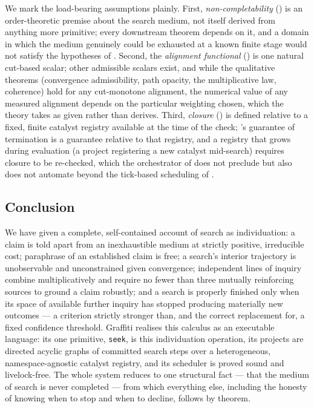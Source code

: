 \documentclass[11pt,twocolumn,a4paper]{article}
\theoremstyle{thmstyle}
\theoremstyle{definition}
\theoremstyle{remark}
\begin{document}
We mark the load-bearing assumptions plainly. First, \emph{non-completability}
() is an order-theoretic premise about the search
medium, not itself derived from anything more primitive; every downstream
theorem depends on it, and a domain in which the medium genuinely could be
exhausted at a known finite stage would not satisfy the hypotheses of
. Second, the \emph{alignment functional}
() is one natural cut-based scalar; other admissible
scalars exist, and while the qualitative theorems (convergence
admissibility, path opacity, the multiplicative law, coherence) hold for
any cut-monotone alignment, the numerical value of any measured alignment
depends on the particular weighting chosen, which the theory takes as
given rather than derives. Third, \emph{closure}
() is defined relative to a fixed, finite catalyst
registry available at the time of the check; 's
guarantee of termination is a guarantee relative to that registry, and a
registry that grows during evaluation (a project registering a new
catalyst mid-search) requires closure to be re-checked, which the
orchestrator of  does not preclude but also does
not automate beyond the tick-based scheduling of .

\subsection{Conclusion}

We have given a complete, self-contained account of search as
individuation: a claim is told apart from an inexhaustible medium at
strictly positive, irreducible cost; paraphrase of an established claim is
free; a search's interior trajectory is unobservable and unconstrained
given convergence; independent lines of inquiry combine multiplicatively
and require no fewer than three mutually reinforcing sources to ground a
claim robustly; and a search is properly finished only when its space of
available further inquiry has stopped producing materially new outcomes ---
a criterion strictly stronger than, and the correct replacement for, a
fixed confidence threshold. Graffiti realises this calculus as an
executable language: its one primitive, \texttt{seek}, is this
individuation operation, its projects are directed acyclic graphs of
committed search steps over a heterogeneous, namespace-agnostic catalyst
registry, and its scheduler is proved sound and livelock-free. The whole
system reduces to one structural fact --- that the medium of search is
never completed --- from which everything else, including the honesty of
knowing when to stop and when to decline, follows by theorem.



\end{document}
